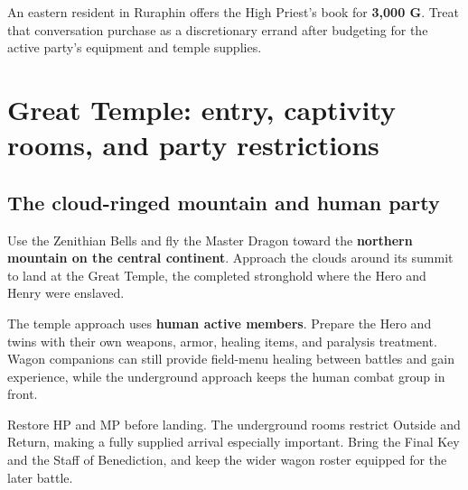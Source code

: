 An eastern resident in Ruraphin offers the High Priest's book
for \textbf{3,000 G}. Treat that conversation purchase as a
discretionary errand after budgeting for the active party's
equipment and temple supplies.



\section{Great Temple: entry, captivity rooms, and party restrictions}

\subsection*{The cloud-ringed mountain and human party}

Use the Zenithian Bells and fly the Master Dragon toward the
\textbf{northern mountain on the central continent}.
Approach the clouds around its summit to land at the Great Temple,
the completed stronghold where the Hero and Henry were enslaved.

The temple approach uses \textbf{human active members}.
Prepare the Hero and twins with their own weapons, armor,
healing items, and paralysis treatment. Wagon companions can
still provide field-menu healing between battles and gain
experience, while the underground approach keeps the human
combat group in front.

Restore HP and MP before landing. The underground rooms restrict
Outside and Return, making a fully supplied arrival especially
important. Bring the Final Key and the Staff of Benediction,
and keep the wider wagon roster equipped for the later battle.


